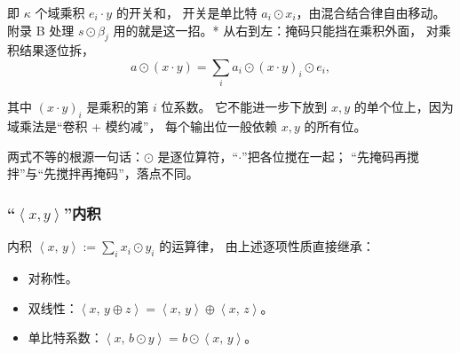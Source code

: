 即 $\kappa$ 个域乘积 $e_i \cdot y$ 的开关和，
开关是单比特 $a_i \odot x_i$，由混合结合律自由移动。附录 B
处理 $s \odot \beta_j$ 用的就是这一招。* 从右到左：掩码只能挡在乘积外面，
对乘积结果逐位拆，
\begin{equation}\label{eq:02-kos15:23}
a \odot \left(x \cdot y\right) = \sum_i a_i \odot \left(x \cdot y\right)_i \odot e_i,
\end{equation}

其中 $\left(x \cdot y\right)_i$ 是乘积的第 $i$ 位系数。
它不能进一步下放到 $x, y$ 的单个位上，因为域乘法是“卷积 + 模约减”，
每个输出位一般依赖 $x, y$ 的所有位。

两式不等的根源一句话：$\odot$ 是逐位算符，“$\cdot$”把各位搅在一起；
“先掩码再搅拌”与“先搅拌再掩码”，落点不同。

\subsubsection{\texorpdfstring{“$\left<x, y\right>$”内积}{“\textbackslash left\textless x，y\textbackslash right\textgreater”内积}}

内积 $\left<x,\, y\right> := \sum_i x_i \odot y_i$ 的运算律，
由上述逐项性质直接继承：

\begin{itemize}

\item
  对称性。
\item
  双线性：$\left<x,\, y \oplus z\right> = \left<x,\, y\right> \oplus \left<x,\, z\right>$。
\item
  单比特系数：$\left<x,\, b \odot y\right> = b \odot \left<x,\, y\right>$。
\end{itemize}
